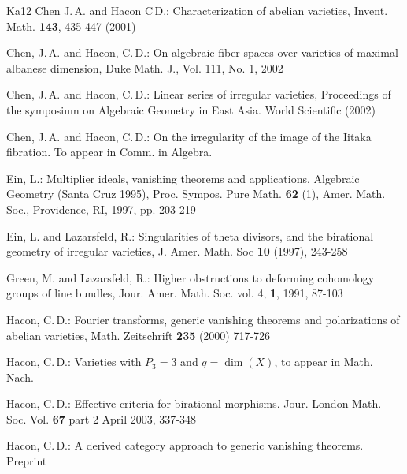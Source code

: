 \documentclass[10pt]{amsart}
\begin{document}
\begin{thebibliography}{Ka12}
{\sc Chen J.\,A.} and {\sc Hacon C\,D.}:
Characterization of abelian varieties,
Invent. Math. {\bf 143}, 435-447 (2001)

{\sc Chen, J.\,A.} and {\sc Hacon, C.\,D.}:
On algebraic fiber spaces over varieties of maximal albanese dimension,
Duke Math. J., Vol. 111, No. 1, 2002

{\sc Chen, J.\,A.} and {\sc Hacon, C.\,D.}:
{Linear series of irregular varieties},
Proceedings  of the symposium
on Algebraic Geometry in East Asia. World Scientific (2002)

{\sc Chen, J.\,A.} and {\sc Hacon, C.\,D.}:
On the irregularity of the image of the Iitaka fibration.
To appear in Comm. in Algebra.

{\sc Ein, L.}:
Multiplier ideals, vanishing theorems and applications,
Algebraic Geometry (Santa Cruz 1995), Proc. Sympos. 
Pure Math. {\bf 62} (1), Amer. Math. Soc.,
Providence, RI, 1997, pp. 203-219

{\sc Ein, L.} and {\sc Lazarsfeld, R.}:
Singularities of theta divisors, and the birational geometry of irregular
varieties, J. Amer. Math. Soc {\bf 10} (1997), 243-258




{\sc Green, M.} and {\sc Lazarsfeld, R.}:
Higher obstructions to deforming cohomology groups of line bundles,
Jour. Amer. Math. Soc.
vol. 4, {\bf 1}, 1991,  87-103

{\sc Hacon, C.\,D.}: Fourier transforms, generic vanishing theorems
and polarizations of abelian varieties, Math. Zeitschrift {\bf 235} (2000)
717-726

{\sc Hacon, C.\,D.}:
Varieties with $P_3=3$ and $q=\dim (X)$, to appear in Math. Nach.

{\sc Hacon, C.\,D.}:
Effective criteria for birational morphisms.
Jour. London Math. Soc. Vol. {\bf 67} part 2 April 2003, 337-348

{\sc Hacon, C.\,D.}:
A derived category approach to generic vanishing theorems.
Preprint


\end{thebibliography}
\end{document}
